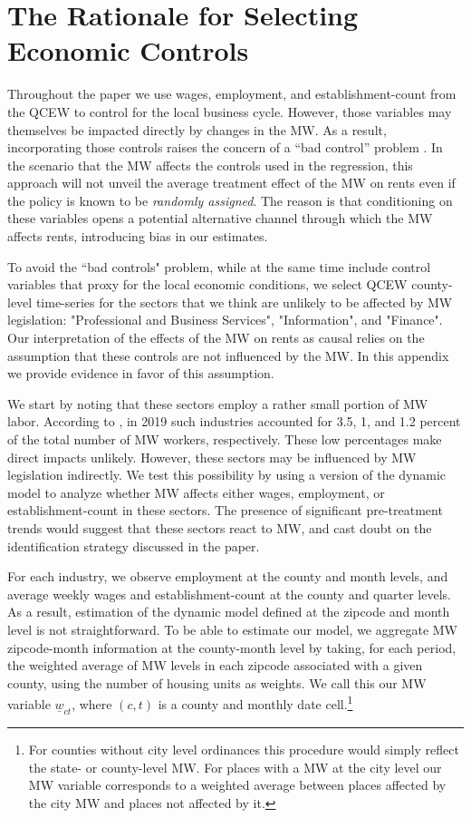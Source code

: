 \clearpage
\section{The Rationale for Selecting Economic Controls}\label{sec:app_econ_control}

Throughout the paper we use wages, employment, and establishment-count from the QCEW to control 
for the local business cycle. However, those variables may themselves be impacted directly by 
changes in the MW. As a result, incorporating those controls raises the concern of a ``bad 
control'' problem \parencite{AngristPischke2009}. In the scenario that the MW affects the 
controls used in the regression, this approach will not unveil the average treatment effect of 
the MW on rents even if the policy is known to be \textit{randomly assigned}. The reason is 
that conditioning on these variables opens a potential alternative channel through which the MW 
affects rents, introducing bias in our estimates.

To avoid the ``bad controls" problem, while at the same time include control variables that 
proxy for the local economic conditions, we select QCEW county-level time-series for the sectors 
that we think are unlikely to be affected by MW legislation: "Professional and Business Services", 
"Information", and "Finance". Our interpretation of the effects of the MW on rents as causal 
relies on the assumption that these controls are not influenced by the MW. In this appendix we 
provide evidence in favor of this assumption.

We start by noting that these sectors employ a rather small portion of MW labor. According to 
\textcite[][table 5]{MinWorkersReportBLS}, in 2019 such industries accounted for 3.5, 1, and 
1.2 percent of the total number of MW workers, respectively. These low percentages make direct
impacts unlikely. However, these sectors may be influenced by MW legislation indirectly. We 
test this possibility by using a version of the dynamic model to analyze whether MW affects 
either wages, employment, or establishment-count in these sectors. The presence of significant 
pre-treatment trends would suggest that these sectors react to MW, and cast doubt on the 
identification strategy discussed in the paper.

For each industry, we observe employment at the county and month levels, and average weekly 
wages and establishment-count at the county and quarter levels. As a result, estimation of the 
dynamic model defined at the zipcode and month level is not straightforward. To be able to 
estimate our model, we aggregate MW zipcode-month information at the county-month level by 
taking, for each period, the weighted average of MW levels in each zipcode associated with a 
given county, using the number of housing units as weights. We call this our MW variable 
$\underline{w}_{ct}$, where $(c, t)$ is a county and monthly date cell.\footnote{For counties 
	without city level ordinances this procedure would simply reflect the state- or 
	county-level 	MW. For places with a MW at the city level our MW variable corresponds to a 
	weighted average between places affected by the city MW and places not affected by it.}

